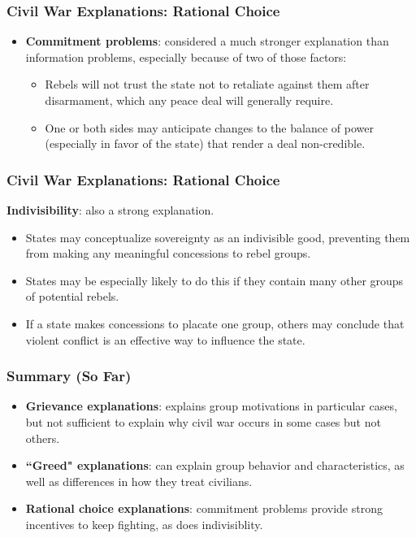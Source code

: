 \documentclass[handout]{beamer}
\begin{document}
\begin{frame} 
	\frametitle{\LARGE{Civil War Explanations: Rational Choice}}
	\begin{itemize}
		\item \textbf{Commitment problems}: considered a much stronger explanation than information problems, especially because of two of those factors:
		\begin{itemize}
			\item Rebels will not trust the state not to retaliate against them after disarmament, which any peace deal will generally require. \pause
			\item One or both sides may anticipate changes to the balance of power (especially in favor of the state) that render a deal non-credible.
		\end{itemize}
	\end{itemize}
\end{frame}


\begin{frame} 
	\frametitle{\LARGE{Civil War Explanations: Rational Choice}}
 \textbf{Indivisibility}: also a strong explanation.
		\begin{itemize}
			\item States may conceptualize sovereignty as an indivisible good, preventing them from making any meaningful concessions to rebel groups. \pause
			\item States may be especially likely to do this if they contain many other groups of potential rebels. \pause
			\item If a state makes concessions to placate one group, others may conclude that violent conflict is an effective way to influence the state.
		\end{itemize}
\end{frame}

\begin{frame} 
	\frametitle{\LARGE{Summary (So Far)}}
	\begin{itemize}
		\item \textbf{Grievance explanations}: explains group motivations in particular cases, but not sufficient to explain why civil war occurs in some cases but not others. \pause
		\item \textbf{``Greed" explanations}: can explain group behavior and characteristics, as well as differences in how they treat civilians. \pause
		\item \textbf{Rational choice explanations}: commitment problems provide strong incentives to keep fighting, as does indivisiblity.
	\end{itemize}
\end{frame}
\end{document}
